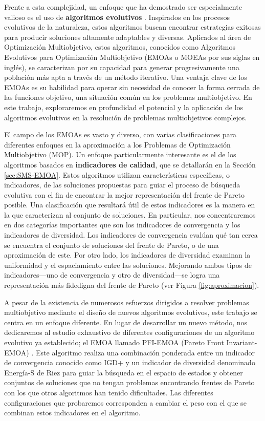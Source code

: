 Frente a esta complejidad, un enfoque que ha demostrado ser especialmente valioso es el uso de \textbf{algoritmos evolutivos} \cite{coelloEvolutionaryAlgorithmsSolving}. Inspirados en los procesos evolutivos de la naturaleza, estos algoritmos buscan encontrar estrategias exitosas para producir soluciones altamente adaptables y diversas. Aplicados al área de Optimización Multiobjetivo, estos algoritmos, conocidos como Algoritmos Evolutivos para Optimización Multiobjetivo (EMOAs o MOEAs por sus siglas en inglés), se caracterizan por su capacidad para generar progresivamente una población más apta a través de un método iterativo. Una ventaja clave de los EMOAs es su habilidad para operar sin necesidad de conocer la forma cerrada de las funciones objetivo, una situación común en los problemas multiobjetivo. En este trabajo, exploraremos en profundidad el potencial y la aplicación de los algoritmos evolutivos en la resolución de problemas multiobjetivos complejos.

El campo de los EMOAs  es vasto y diverso, con varias clasificaciones para diferentes enfoques en la aproximación a los Problemas de Optimización Multiobjetivo (MOP). Un enfoque particularmente interesante es el de los algoritmos basados en \textbf{indicadores de calidad}, que se detallarán en la Sección \ref{sec:SMS-EMOA}. Estos algoritmos utilizan características específicas, o indicadores, de las soluciones propuestas para guiar el proceso de búsqueda evolutiva con el fin de encontrar la mejor representación del frente de Pareto posible. Una clasificación que resultará útil de estos indicadores es la manera en la que caracterizan al conjunto de soluciones. En particular, nos concentraremos en dos categorías importantes que son los indicadores de convergencia y los indicadores de diversidad. Los indicadores de convergencia evalúan qué tan cerca se encuentra el conjunto de soluciones del frente de Pareto, o de una aproximación de este. Por otro lado, los indicadores de diversidad examinan la uniformidad y el espaciamiento entre las soluciones. Mejorando ambos tipos de indicadores—uno de convergencia y otro de diversidad—se logra una representación más fidedigna del frente de Pareto (ver Figura \ref{fig:aproximacion}).

A pesar de la existencia de numerosos esfuerzos dirigidos a resolver problemas multiobjetivo mediante el diseño de nuevos algoritmos evolutivos, este trabajo se centra en un enfoque diferente. En lugar de desarrollar un nuevo método, nos dedicaremos al estudio exhaustivo de diferentes configuraciones de un algoritmo evolutivo ya establecido; el EMOA llamado PFI-EMOA (Pareto Front Invariant-EMOA) \cite{PFI}. Este algoritmo realiza una combinación ponderada entre un indicador de convergencia conocido como IGD+ \cite{IGD} y un indicador de diversidad denominado Energía-S de Riez \cite{sEnergy} para guiar la búsqueda en el espacio de estados y obtener conjuntos de soluciones que no tengan problemas encontrando frentes de Pareto con los que otros algoritmos han tenido dificultades. Las diferentes configuraciones que probaremos corresponden a cambiar el peso con el que se combinan estos indicadores en el algoritmo. 
    
